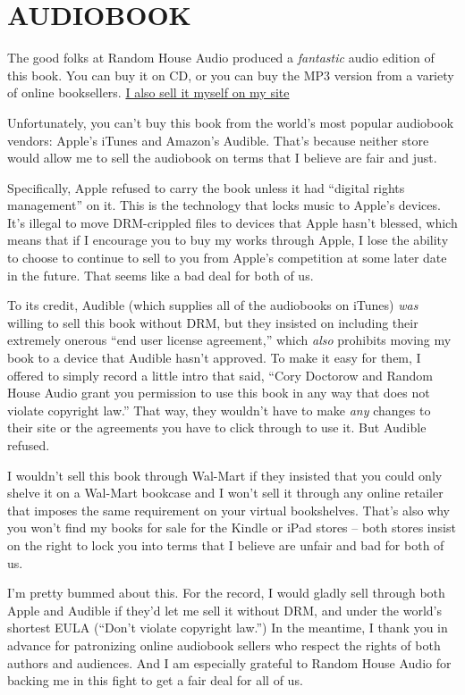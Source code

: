 \section{AUDIOBOOK}

The good folks at Random House Audio produced a \emph{fantastic}
audio edition of this book. You can buy it on CD, or you can buy
the MP3 version from a variety of online booksellers.
\href{http://craphound.com/?cat=10}{I also sell it myself on my site}

Unfortunately, you can't buy this book from the world's most
popular audiobook vendors: Apple's iTunes and Amazon's Audible.
That's because neither store would allow me to sell the audiobook
on terms that I believe are fair and just.

Specifically, Apple refused to carry the book unless it had
``digital rights management'' on it. This is the technology that
locks music to Apple's devices. It's illegal to move DRM-crippled
files to devices that Apple hasn't blessed, which means that if I
encourage you to buy my works through Apple, I lose the ability to
choose to continue to sell to you from Apple's competition at some
later date in the future. That seems like a bad deal for both of
us.

To its credit, Audible (which supplies all of the audiobooks on
iTunes) \emph{was} willing to sell this book without DRM, but they
insisted on including their extremely onerous ``end user license
agreement,'' which \emph{also} prohibits moving my book to a device
that Audible hasn't approved. To make it easy for them, I offered
to simply record a little intro that said, ``Cory Doctorow and
Random House Audio grant you permission to use this book in any way
that does not violate copyright law.'' That way, they wouldn't have
to make \emph{any} changes to their site or the agreements you have
to click through to use it. But Audible refused.

I wouldn't sell this book through Wal-Mart if they insisted that
you could only shelve it on a Wal-Mart bookcase and I won't sell it
through any online retailer that imposes the same requirement on
your virtual bookshelves. That's also why you won't find my books
for sale for the Kindle or iPad stores -- both stores insist on the
right to lock you into terms that I believe are unfair and bad for
both of us.

I'm pretty bummed about this. For the record, I would gladly sell
through both Apple and Audible if they'd let me sell it without
DRM, and under the world's shortest EULA (``Don't violate copyright
law.'') In the meantime, I thank you in advance for patronizing
online audiobook sellers who respect the rights of both authors and
audiences. And I am especially grateful to Random House Audio for
backing me in this fight to get a fair deal for all of us.

